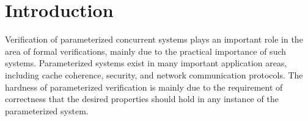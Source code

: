 \documentclass[conference]{IEEEtran}
\newcommand{\forget}[1]{}
\begin{document}

\section{Introduction }
\vspace{-5pt}
Verification of parameterized concurrent systems plays an important role in the area of formal verifications, mainly due to the practical importance
of such systems. Parameterized systems exist in many important
application areas, including cache coherence, security, and
network communication protocols. %
The hardness of parameterized verification is mainly due to the requirement of correctness that
the desired properties should hold in any instance of the parameterized
system.
\forget{
The model checkers, although powerful in verification of
non-parameterized systems, become impractical to verify parameterized systems, as they can verify only an instance of the parameterized
system in each execution.
A desirable approach is to provide a proof that the correctness holds for any instance.
}
\end{document}
